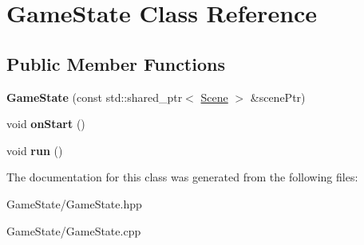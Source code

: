 \hypertarget{class_game_state}{}\section{Game\+State Class Reference}
\label{class_game_state}
\subsection*{Public Member Functions}
\begin{DoxyCompactItemize}
\item 
\mbox{\label{class_game_state_af6c6ce13bb412e23880c062044574bfc}} 
{\bfseries Game\+State} (const std\+::shared\+\_\+ptr$<$ \mbox{\hyperlink{class_scene}{Scene}} $>$ \&scene\+Ptr)
\item 
\mbox{\label{class_game_state_a3b426f55ad7053f77f24eaae38cf2f9e}} 
void {\bfseries on\+Start} ()
\item 
\mbox{\label{class_game_state_a900313eb102c9466e80903a654b7ee3e}} 
void {\bfseries run} ()
\end{DoxyCompactItemize}


The documentation for this class was generated from the following files\+:\begin{DoxyCompactItemize}
\item 
Game\+State/Game\+State.\+hpp\item 
Game\+State/Game\+State.\+cpp\end{DoxyCompactItemize}

